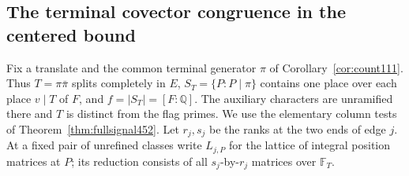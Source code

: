 \documentclass[a4paper,11pt]{article}
\theoremstyle{definition}
\theoremstyle{remark}
\numberwithin{equation}{section}
\begin{document}
\subsection{The terminal covector congruence in the centered bound}
\label{sec:terminalramps454}

Fix a translate and the common terminal generator \(\pi\) of
Corollary~\ref{cor:count111}. Thus \(T=\pi\bar\pi\) splits
completely in \(E\), \(S_T=\{P:P\mid\pi\}\) contains one place
over each place \(v\mid T\) of \(F\), and \(f=|S_T|=[F:\mathbb Q]\).
The auxiliary characters are unramified there and \(T\) is
distinct from the flag primes. We use the elementary column
tests of Theorem~\ref{thm:fullsignal452}. Let \(r_j,s_j\) be the
ranks at the two ends of edge \(j\). At a fixed pair of unrefined
classes write \(L_{j,P}\) for the lattice of integral position
matrices at \(P\); its reduction consists of all \(s_j\)-by-\(r_j\)
matrices over \(\mathbb F_T\).
\end{document}
